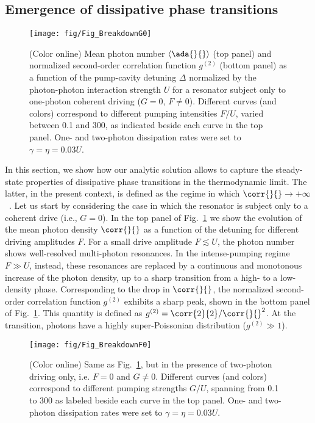 \subsection{Emergence of dissipative phase transitions}\label{Subsec:PhaseTransitions}

\begin{figure}[t]
	\texttt{[image: fig/Fig\_BreakdownG0]}
	\caption{(Color online)
		Mean photon number $\braket{\ada{}{}}$ (top panel) and normalized second-order correlation function $g^{(2)}$ (bottom panel) as a function of the pump-cavity detuning $\Delta$ normalized by the photon-photon interaction strength $U$ for a resonator subject only to one-photon coherent driving ($G=0$, $F\neq0$).
		Different curves (and colors) correspond to different pumping intensities $F/U$, varied between 0.1 and 300, as indicated beside each curve in the top panel.
		One- and two-photon dissipation rates were set to $\gamma=\eta=0.03U$.}
	\label{Fig:BreakdownG0}
\end{figure}

In this section, we show how our analytic solution allows to capture the steady-state properties of dissipative phase transitions in the thermodynamic limit.
The latter, in the present context, is defined as the regime in which $\corr{}{}\to+\infty$~\cite{CarmichaelPRX15,CasteelsarXiv16}.
Let us start by considering the case in which the resonator is subject only to a coherent drive (i.e., $G=0$).
In the top panel of Fig.~\ref{Fig:BreakdownG0} we show the evolution of the mean photon density $\corr{}{}$ as a function of the detuning for different driving amplitudes $F$.
For a small drive amplitude $F\lesssim U$, the photon number shows well-resolved multi-photon resonances.
In the intense-pumping regime $F\gg U$, instead, these resonances are replaced by a continuous and monotonous increase of the photon density, up to a sharp transition from a high- to a low-density phase. 
Corresponding to the drop in $\corr{}{}$, the normalized second-order correlation function $g^{(2)}$ exhibits a sharp peak, shown in the bottom panel of Fig.~\ref{Fig:BreakdownG0}.
This quantity is defined as \mbox{$g^{(2)}=\corr{2}{2}/\corr{}{}^2$}.
At the transition, photons have a highly super-Poissonian distribution ($g^{(2)}\gg1$).

\begin{figure}[t]
	\texttt{[image: fig/Fig\_BreakdownF0]}
	\caption{(Color online)
		Same as Fig.~\ref{Fig:BreakdownG0}, but in the presence of two-photon driving only, i.e. $F=0$ and $G\neq0$.	Different curves (and colors) correspond to different pumping strengths $G/U$, spanning from 0.1 to 300 as labeled beside each curve in the top panel.
		One- and two-photon dissipation rates were set to $\gamma=\eta=0.03U$.}
	\label{Fig:BreakdownF0}
\end{figure}

